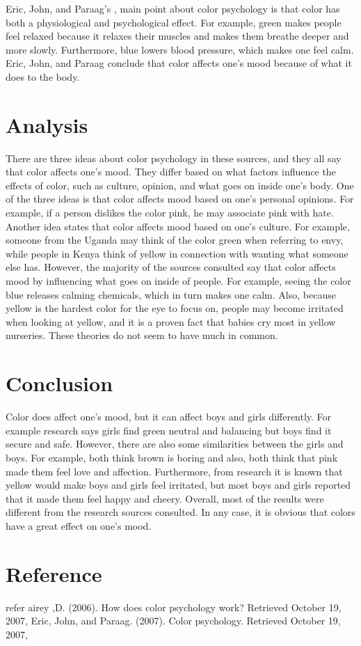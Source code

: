 \documentclass[11pt]{book}              %
\begin{document}
Eric, John, and Paraag’s , main point about color psychology is that color has both a physiological and psychological effect. For example, green makes people feel relaxed because it relaxes their muscles and makes them breathe deeper and more slowly. Furthermore, blue lowers blood pressure, which makes one feel calm. Eric, John, and Paraag conclude that color affects one’s mood because of what it does to the body.



\section{Analysis}
There are three ideas about color psychology in these sources, and they all say that color affects one’s mood. They differ based on what factors influence the effects of color, such as culture, opinion, and what goes on inside one’s body. One of the three ideas is that color affects mood based on one’s personal opinions. For example, if a person dislikes the color pink, he may associate pink with hate. Another idea states that color affects mood based on one’s culture. For example, someone from the Uganda may think of the color green when referring to envy, while people in Kenya think of yellow in connection with wanting what someone else has. However, the majority of the sources consulted say that color affects mood by influencing what goes on inside of people. For example, seeing the color blue releases calming chemicals, which in turn makes one calm. Also, because yellow is the hardest color for the eye to focus on, people may become irritated when looking at yellow, and it is a proven fact that babies cry most in yellow nurseries. These theories do not seem to have much in common.
\section{Conclusion}
Color does affect one’s mood, but it can affect boys and girls differently. For example research says girls find green neutral and balancing but boys find it secure and safe. However, there are also some similarities between the girls 
and boys. For example, both think brown is boring and also, both think that pink made them feel love and affection. Furthermore, from research it is known that yellow would make boys and girls feel irritated, but most boys and girls reported that it made them feel happy and cheery. Overall, most of the results were different from the research sources consulted. In any case, it is obvious that colors have a great effect on one’s mood.

\section{ Reference}
 refer airey ,D. (2006). How does color psychology work? Retrieved
October 19, 2007, Eric, John, and Paraag. (2007). Color psychology. Retrieved
October 19, 2007,


                                       
\end{document}
